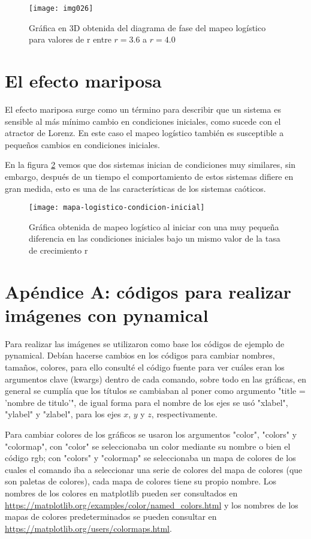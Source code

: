 \begin{figure}[ht!]
\centering
\texttt{[image: img026]}
\caption{Gráfica en 3D obtenida del diagrama de fase del mapeo logístico para valores de r entre $r=3.6$ a $r=4.0$}
\label{atr5}
\end{figure}
\pagebreak
\newpage

\section{El efecto mariposa}
\noindent El efecto mariposa surge como un término para describir que un sistema es sensible al más mínimo cambio en condiciones iniciales, como sucede con el atractor de Lorenz. En este caso el mapeo logístico también es susceptible a pequeños cambios en condiciones iniciales.

En la figura \ref{mps} vemos que dos sistemas inician de condiciones muy similares, sin embargo, después de un tiempo el comportamiento de estos sistemas difiere en gran medida, esto es una de las características de los sistemas caóticos.

\begin{figure}[ht!]
\centering
\texttt{[image: mapa-logistico-condicion-inicial]}
\caption{Gráfica obtenida de mapeo logístico al iniciar con una muy pequeña diferencia en las condiciones iniciales bajo un mismo valor de la tasa de crecimiento r}
\label{mps}
\end{figure}

\section*{Apéndice A: códigos para realizar imágenes con pynamical}
Para realizar las imágenes se utilizaron como base los códigos de ejemplo de pynamical. Debían hacerse cambios en los códigos para cambiar nombres, tamaños, colores, para ello consulté el código fuente para ver cuáles eran los argumentos clave (\*kwargs) dentro de cada comando, sobre todo en las gráficas, en general se cumplía que los títulos se cambiaban al poner como argumento "\textsf{title = 'nombre de titulo'}", de igual forma para el nombre de los ejes se usó "\textsf{xlabel}", "\textsf{ylabel}" y "\textsf{zlabel}", para los ejes $x$, $y$ y $z$, respectivamente.

Para cambiar colores de los gráficos se usaron los argumentos "\textsf{color}", "\textsf{colors}" y "\textsf{colormap}", con "color" se seleccionaba un color mediante su nombre o bien el código rgb; con "colors" y "colormap" se seleccionaba un mapa de colores de los cuales el comando iba a seleccionar una serie de colores del mapa de colores (que son paletas de colores), cada mapa de colores tiene su propio nombre. Los nombres de los colores en matplotlib pueden ser consultados en \url{https://matplotlib.org/examples/color/named_colors.html} y los nombres de los mapas de colores predeterminados se pueden consultar en \url{https://matplotlib.org/users/colormaps.html}.

